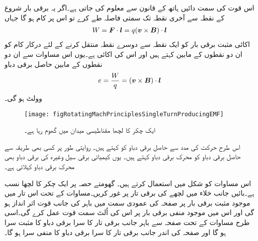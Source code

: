 اس قوت کی سمت دائیں ہاتھ کے قانون سے معلوم کی جاتی ہے۔اگر یہ برقی بار شروع کے نقطہ سے آخری نقطہ تک سمتی فاصلہ   طے کرے تو اس پر  کام ہو گا جہاں
\begin{align}
W={{\boldsymbol{F}}} \cdot {\ensuremath{{\boldsymbol{l}}}}=q ({{\boldsymbol{v}}} \times {\ensuremath{{\boldsymbol{B}}}}) \cdot {\ensuremath{{\boldsymbol{l}}}}
\end{align}
اکائی مثبت برقی بار کو ایک نقطہ سے دوسرے نقطہ منتقل کرنے کے لئے درکار کام کو ان دو نقطوں کے مابین   کہتے ہیں اور اس کی اکائی    ہے۔یوں اس مساوات سے ان دو نقطوں کے مابین حاصل برقی دباو
\begin{align}\label{مساوات_گھومتے_مشین_برقی_دباو_تعریف}
e=\frac{W}{q}= ({{\boldsymbol{v}}} \times {\ensuremath{{\boldsymbol{B}}}}) \cdot {\ensuremath{{\boldsymbol{l}}}}
\end{align}
وولٹ ہو گی۔
\begin{figure}
\centering
\texttt{[image: figRotatingMachPrinciplesSingleTurnProducingEMF]}
\caption{ایک چکر کا لچھا مقناطیسی میدان میں گھوم رہا ہے۔}
\label{شکل_گھومتے_مشین_ایک_چکر_کی_پیدا_دباو}
\end{figure}

اس طرح حرکت کی مدد سے حاصل برقی دباو کو   کہتے ہیں۔ روایتی طور پر کسی بھی طریقہ سے حاصل برقی دباو کو محرک برقی دباو کہتے ہیں۔ یوں کیمیائی برقی سیل وغیرہ کی برقی دباو بھی محرک برقی دباو کہلاتی  ہے۔

اس مساوات کو شکل  میں استعمال کرتے ہیں۔ گھومتے حصہ پر ایک چکر کا لچھا نسب ہے۔بائیں جانب خلاء میں لچھے کی برقی تار پر غور کریں۔مساوات   کے تحت اس تار میں موجود مثبت برقی بار پر صفحہ کی عمودی سمت میں باہر کی جانب قوت اثر انداز ہو گی اور اس میں موجود منفی برقی بار پر اس کی اُلٹ سمت قوت عمل کرے گی۔اسی طرح مساوات   کے تحت صفحہ سے باہر جانب برقی تار کا سرا برقی دباو   کا مثبت سرا ہو گا اور صفحہ کی اندر جانب برقی تار کا سرا برقی دباو  کا منفی سرا ہو گا۔

